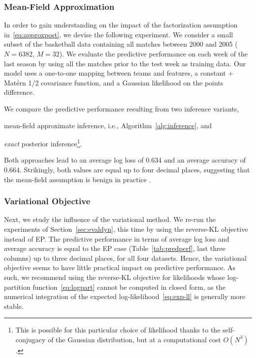 \subsubsection{Mean-Field Approximation}
In order to gain understanding on the impact of the factorization assumption in~\eqref{eq:approxpost}, we devise the following experiment.
We consider a small subset of the basketball data containing all matches between 2000 and 2005 ($N = 6382$, $M = 32$).
We evaluate the predictive performance on each week of the last season by using all the matches prior to the test week as training data.
Our model uses a one-to-one mapping between teams and features, a constant + Matérn 1/2 covariance function, and a Gaussian likelihood on the points difference.

We compare the predictive performance resulting from two inference variants,
\begin{enuminline}
	\item mean-field approximate inference, i.e., Algorithm~\ref{alg:inference}, and
	\item \emph{exact} posterior inference\footnote{%
		This is possible for this particular choice of likelihood thanks to the self-conjugacy of the Gaussian distribution, but at a computational cost $O(N^3)$.}.
\end{enuminline}
Both approaches lead to an average log loss of \num{0.634} and an average accuracy of \num{0.664}.
Strikingly, both values are equal up to four decimal places, suggesting that the mean-field assumption is benign in practice \citep{birlutiu2007expectation}.


\subsubsection{Variational Objective}
Next, we study the influence of the variational method.
We re-run the experiments of Section~\ref{sec:evaldyn}, this time by using the reverse-KL objective instead of EP.
The predictive performance in terms of average log loss and average accuracy is equal to the EP case (Table~\ref{tab:predperf}, last three columns) up to three decimal places, for all four datasets.
Hence, the variational objective seems to have little practical impact on predictive performance.
As such, we recommend using the reverse-KL objective for likelihoods whose log-partition function~\eqref{eq:logpart} cannot be computed in closed form, as the numerical integration of the expected log-likelihood~\eqref{eq:exp-ll} is generally more stable.



